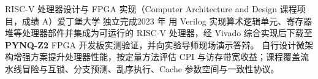     \resumeSubheading
      {RISC-V 处理器设计与 FPGA 实现（Computer Architecture and Design 课程项目，成绩 A）}{爱丁堡大学}
      {独立完成}{2023 年}
      \resumeItemListStart
          {用 Verilog 实现算术逻辑单元、寄存器堆等处理器部件并集成为可运行的 RISC-V 处理器，经 Vivado 综合实现后下载至 \textbf{PYNQ-Z2} FPGA 开发板实测验证，并向实验导师现场演示答辩。}
          {自行设计微架构增强方案提升处理器性能，按定量方法评估 CPI 与访存带宽收益；课程覆盖流水线冒险与互锁、分支预测、乱序执行、Cache 参数空间与一致性协议。}
      \resumeItemListEnd
